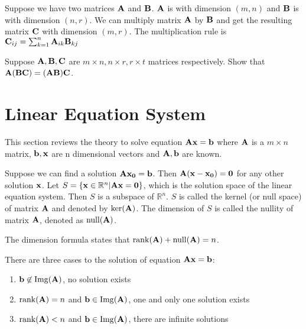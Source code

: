 Suppose we have two matrices $\mathbf{A}$ and $\mathbf{B}$.  $\mathbf{A}$ is with dimension $(m,n)$ and $\mathbf{B}$ is with dimension $(n,r)$. We can multiply matrix $\mathbf{A}$ by $\mathbf{B}$ and get the resulting matrix $\mathbf{C}$ with dimension $(m, r)$. The multiplication rule is $\mathbf{C}_{ij} = \sum_{k=1}^n \mathbf{A}_{ik}\mathbf{B}_{kj}$

\begin{exercise}
Suppose $\mathbf{A}, \mathbf{B}, \mathbf{C}$ are $m\times n, n\times r, r \times t$ matrices respectively.	Show that $\mathbf{A}(\mathbf{B}\mathbf{C}) = (\mathbf{A}\mathbf{B})\mathbf{C}$.
\end{exercise}


\section{Linear Equation System}
This section reviews the theory to solve equation $\mathbf{A}\mathbf{x}=\mathbf{b}$ where $\mathbf{A}$ is a $m \times n$ matrix, $\mathbf{b}, \mathbf{x}$ are n dimensional vectors and $\mathbf{A}, \mathbf{b}$ are known.

Suppose we can find a solution $\mathbf{A}\mathbf{x_0} = \mathbf{b}$. Then $\mathbf{A}(\mathbf{x}-\mathbf{x_0})=\mathbf{0}$ for any other solution $\mathbf{x}$. Let $S = \{\mathbf{x} \in \mathbb{R}^n | \mathbf{A}\mathbf{x}=\mathbf{0}\}$, which is the solution space of the linear equation system. Then $S$ is a subspace of $\mathbb{R}^n$. $S$ is called the kernel (or null space) of matrix $\mathbf{A}$ and denoted by $\mathrm{ker}(\mathbf{A})$. The dimension of $S$ is called the nullity of matrix $\mathbf{A}$, denoted as $\mathrm{null}(\mathbf{A})$.

The dimension formula states that $\mathrm{rank}(\mathbf{A}) + \mathrm{null}(\mathbf{A}) = n$.

There are three cases to the solution of equation $\mathbf{A}\mathbf{x}=\mathbf{b}$:
\begin{enumerate}
\item $\mathbf{b} \not\in \mathrm{Img}(\mathbf{A})$, no solution exists
\item $\mathrm{rank}(\mathbf{A}) = n$ and $\mathbf{b} \in \mathrm{Img}(\mathbf{A})$, one and only one solution exists
\item $\mathrm{rank}(\mathbf{A}) < n$ and $\mathbf{b} \in \mathrm{Img}(\mathbf{A})$, there are infinite solutions
\end{enumerate}